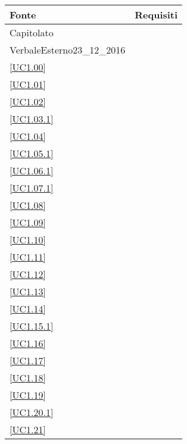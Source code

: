 \begin{longtable}{|P{6cm}|P{6cm}|}
	\hline \textbf{Fonte} & \textbf{Requisiti}\\
	\hline Capitolato &  \linebreak {} \linebreak {} \linebreak {} \linebreak {} \\
	\hline VerbaleEsterno23\_12\_2016 &  \linebreak {} \\
	\hline \ref{UC1.00} &  \\
	\hline \ref{UC1.01} &  \\
	\hline \ref{UC1.02} &  \\
	\hline \ref{UC1.03.1} &  \\
	\hline \ref{UC1.04} &  \\
	\hline \ref{UC1.05.1} &  \\
	\hline \ref{UC1.06.1} &  \\
	\hline \ref{UC1.07.1} &  \\
	\hline \ref{UC1.08} &  \\
	\hline \ref{UC1.09} &  \\
	\hline \ref{UC1.10} &  \\
	\hline \ref{UC1.11} &  \\	
	\hline \ref{UC1.12} &  \\
	\hline \ref{UC1.13} &  \\	
	\hline \ref{UC1.14} &  \\
	\hline \ref{UC1.15.1} &  \\
	\hline \ref{UC1.16} &  \\
	\hline \ref{UC1.17} &  \\
	\hline \ref{UC1.18} &  \\
	\hline \ref{UC1.19} &  \\
	\hline \ref{UC1.20.1} &  \\
	\hline \ref{UC1.21} &  \\

\end{longtable}
